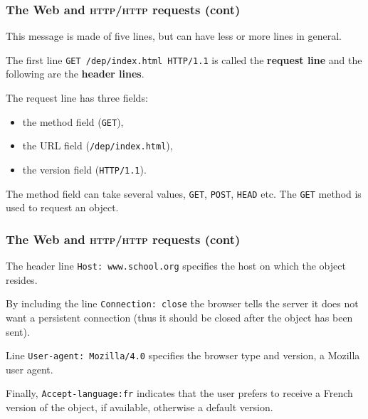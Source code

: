%
\begin{frame}[containsverbatim]
\frametitle{The Web and \textsc{http}/\textsc{http} requests (cont)}

This message is made of five lines, but can have less or more lines in
general.

\bigskip

The first line \verb+GET /dep/index.html HTTP/1.1+ is called the
\textbf{request line} and the following are the \textbf{header
  lines}.

\bigskip

The request line has three fields: 
\begin{itemize}

  \item the method field (\verb+GET+), 

  \item the URL field (\verb+/dep/index.html+),

  \item the version field (\verb+HTTP/1.1+).

\end{itemize}
The method field can take several values, \verb+GET+, \verb+POST+,
\verb+HEAD+ etc. The \verb+GET+ method is used to request an object.

\end{frame}

%
\begin{frame}[containsverbatim]
\frametitle{The Web and \textsc{http}/\textsc{http} requests (cont)}

The header line \verb+Host: www.school.org+ specifies the host on
which the object resides.

\bigskip

By including the line \verb+Connection: close+ the browser tells the
server it does not want a persistent connection (thus it should be
closed after the object has been sent).

\bigskip

Line \verb+User-agent: Mozilla/4.0+ specifies the browser type and
version, a Mozilla user agent.

\bigskip

Finally, \verb+Accept-language:fr+ indicates that the user prefers to
receive a French version of the object, if available, otherwise a
default version.

\end{frame}

